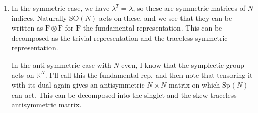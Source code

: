 \documentclass[11pt, class=article, crop=false]{standalone}
\begin{document}
\begin{enumerate}
%
	 \item In the symmetric case, we have $\lambda^T = \lambda$, so these are symmetric matrices of $N$ indices. Naturally $\mathrm{SO}(N)$ acts on these, and we see that they can be written as $\mathrm{F} \otimes \mathrm{F}$ for $\mathrm{F}$ the fundamental representation. This can be decomposed as the trivial representation and the traceless symmetric representation.  
	 
	 In the anti-symmetric case with $N$ even, I know that the symplectic group acts on $\mathbb R^{N}$. I'll call this the fundamental rep, and then note that tensoring it with its dual again gives an antisymmetric $N \times N$ matrix on which $\mathrm{Sp}(N)$ can act. This can be decomposed into the singlet and the skew-traceless antisymmetric matrix. 
	 

\end{enumerate}
\end{document}
